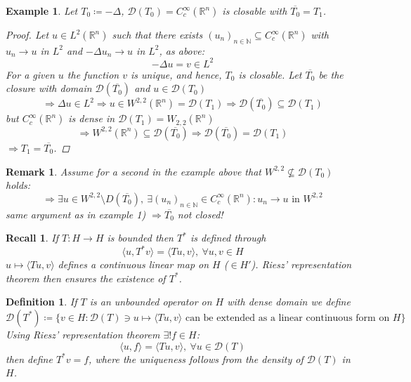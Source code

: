 \documentclass[12pt]{extreport} %
\newcommand{\N}{\mathbb{N}}
\newcommand{\R}{\mathbb{R}}
\newcommand{\DO}[1]{\mathcal{D}\left( {#1} \right)}
\theoremstyle{named}
\theoremstyle{nnamed}
\theoremstyle{itshape}
\newtheorem{definition}{Definition}  \counterwithin{definition}{chapter}
\theoremstyle{normal}
\newtheorem*{recall}{Recall}
\newtheorem*{example}{Example}
\newtheorem*{remark}{Remark}
\begin{document}
\begin{example}
	Let $T_0 \coloneqq - \Delta$, $\DO{T_0} = C_c^\infty(\R^n)$ is closable with $\overline{T_0} = T_1$.
	 
	\begin{proof}
		Let $u \in L^2(\R^n)$ such that there exists $(u_n)_{n \in \N} \subseteq C_c^\infty(\R^n)$ with $u_n \rightarrow u$ in $L^2$ and $-\Delta u_n \rightarrow u$ in $L^2$, as above: 
		$$ -\Delta u = v \in L^2 $$
		For a given $u$ the function $v$ is unique, and hence, $T_0$ is closable. Let $\overline{T_0}$ be the closure with domain $\DO{\overline{T_0}}$ and $u \in \DO{T_0}$
		$$ \Rightarrow \Delta u \in L^2 \Rightarrow u \in W^{2,2}(\R^n) = \DO{T_1} \Rightarrow \DO{\overline{T_0}} \subseteq \DO{T_1} $$
		but $C_c^{\infty}(\R^n)$ is dense in $\DO{T_1} = W_{2,2}(\R^n)$
		$$ \Rightarrow W^{2,2}(\R^n) \subseteq \DO{\overline{T_0}} \Rightarrow \DO{\overline{T_0}} = \DO{T_1} $$
		$\Rightarrow T_1 = \overline{T_0}$. 
	\end{proof}	
\end{example}

\begin{remark}
	Assume for a second in the example above that $W^{2,2} \not\subseteq \DO{T_0}$ holds:
		$$ \Rightarrow \exists u \in W^{2, 2} \setminus D \left( \overline{T_0} \right), ~\exists (u_n)_{n \in \N} \in C^{\infty}_c (\R^n): u_n \rightarrow u \text{ in } W^{2, 2}$$ same argument as in example 1) $\Rightarrow \overline{T_0}$ not closed!	
\end{remark}


\begin{recall}
	If $T \colon H \rightarrow H$ is bounded then $T^*$ is defined through
	$$ \langle u , T^* v \rangle = \langle T u , v \rangle, ~ \forall u, v \in H $$	
	$u \mapsto \langle T u, v \rangle$ defines a continuous linear map on $H$ ($\in H'$). Riesz' representation theorem then ensures the existence of $T^*$.
\end{recall}

\begin{definition}
	If $T$ is an unbounded operator on $H$ with dense domain we define
		$$ \DO{T^*} \coloneqq \big\{ v \in H \colon \DO{T} \ni u \mapsto \langle T u, v \rangle \text{ can be extended as a linear continuous form on } H \big\} $$
	Using Riesz' representation theorem $\exists! f \in H$:
		$$ \langle u, f \rangle = \langle T u, v \rangle, ~ \forall u \in \DO{T} $$
	then define $T^* v = f$, where the uniqueness follows from the density of $\DO{T}$ in $H$.
\end{definition}
\end{document}
